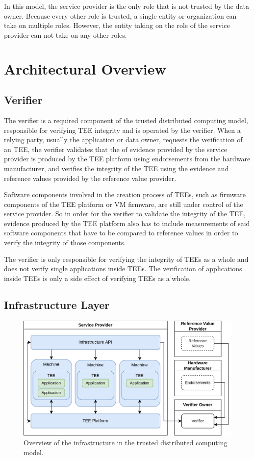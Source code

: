 In this model, the service provider is the only role that is not trusted by the
data owner. Because every other role is trusted, a single entity or organization
can take on multiple roles. However, the entity taking on the role of the
service provider can not take on any other roles.

\section{Architectural Overview}

\subsection{Verifier}

The verifier is a required component of the trusted distributed computing
model, responsible for verifying TEE integrity and is operated by the verifier.
When a relying party, usually the application or data owner, requests the
verification of an TEE, the verifier validates that the of evidence provided by
the service provider is produced by the TEE platform using endorsements from the
hardware manufacturer, and verifies the integrity of the TEE using the evidence
and reference values provided by the reference value provider.

Software components involved in the creation process of TEEs, such as firmware
components of the TEE platform or VM firmware, are still under control of the
service provider. So in order for the verifier to validate the integrity of the
TEE, evidence produced by the TEE platform also has to include measurements of
said software components that have to be compared to reference values in order
to verify the integrity of those components.

The verifier is only responsible for verifying the integrity of TEEs as a whole
and does not verify single applications inside TEEs. The verification of
applications inside TEEs is only a side effect of verifying TEEs as a whole.

\subsection{Infrastructure Layer}

\begin{figure}[H]
  \centering
  \includegraphics[width=0.9\linewidth]{resources/untrusted-infrastructure-architecture.drawio.png}
  \caption{Overview of the infrastructure in the trusted distributed computing model.}
  \label{fig:untrusted-architecture-overview}
\end{figure}

